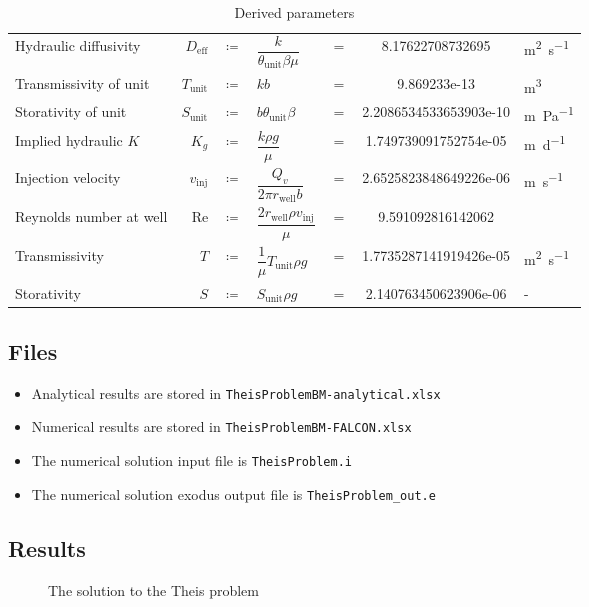 \setlength{\tabcolsep}{3pt}
\renewcommand{\arraystretch}{1.5}
\begin{table}[h]
	\caption{Derived parameters}
	\begin{center}
		\begin{tabular}{lrclcSs}
		Hydraulic diffusivity & $D_{\text{eff}}$ & $\coloneqq$ & $ \dfrac{k}{\theta_{\text{unit}}\beta\mu}$ & $=$ &8.17622708732695&\si{\metre\squared\per\second} \\
		Transmissivity of unit & $T_{\text{unit}}$ & $\coloneqq$ & $k b $& $=$ &9.869233e-13& \si{\metre\cubed} \\
		Storativity of unit & $S_{\text{unit}}$ & $\coloneqq$ & $b\theta_{\text{unit}}\beta$& $=$ &2.2086534533653903e-10&\si{\metre\per\pascal} \\
		Implied hydraulic $K$ & $K_{g}$ & $\coloneqq$ & $\dfrac{k\rho g}{\mu}$& $=$ &1.749739091752754e-05&\si{\metre\per\day} \\
		Injection velocity & $v_{\text{inj}}$ & $\coloneqq$ & $\dfrac{Q_v}{2\pi r_{\text{well}}b}$& $=$ &2.6525823848649226e-06&\si{\metre\per\second} \\
		Reynolds number at well & $\text{Re}$ & $\coloneqq$ & $\dfrac{2 r_{\text{well}}\rho v_{\text{inj}}}{\mu}$& $=$ &9.591092816142062& \\

		Transmissivity & $T$ & $\coloneqq$ & $\dfrac{1}{\mu}T_{\text{unit}}\rho g $& $=$ & 1.7735287141919426e-05& \si{\metre\squared\per\second} \\

		Storativity & $S$ & $\coloneqq$ & $S_{\text{unit}}\rho g$& $=$ &  2.140763450623906e-06&  -
	\end{tabular}
	\end{center}
	\label{tab:TheisDerivPar}
\end{table}

\subsection{Files}
\begin{itemize}
	\item Analytical results are stored in \verb|TheisProblemBM-analytical.xlsx|
	\item Numerical results are stored in \verb|TheisProblemBM-FALCON.xlsx|
	\item The numerical solution input file is \verb|TheisProblem.i|
	\item The numerical solution exodus output file is \verb|TheisProblem_out.e|
\end{itemize}
\subsection{Results}

\begin{figure}[h!]
	\begin{center}
		\setlength\figureheight{8cm} 
		\setlength{} 
		
	\end{center}
	\caption{The solution to the Theis problem}
	\label{fig:Theis}
\end{figure}
